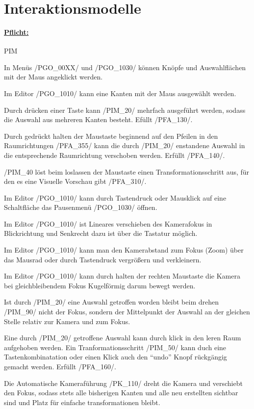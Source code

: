 %
%


%
%
\clearpage


\section{Interaktionsmodelle}
\label{NU:Interaktion}


\paragraph*{\underline{Pflicht:}}

\begin{ids}{\gls{PIM}}

	\id[10] In Menüs /PGO\_00XX/ und /PGO\_1030/ können Knöpfe und Auswahlflächen mit der Maus angeklickt werden.
	
	\id[20] Im Editor /PGO\_1010/ kann eine Kanten mit der Maus ausgewählt werden.
	
	\id[30] Durch drücken einer Taste kann /PIM\_20/ mehrfach ausgeführt werden, sodass die Auswahl aus mehreren Kanten besteht. Efüllt /PFA\_130/.
	
	\id[40] Durch gedrückt halten der Maustaste beginnend auf den Pfeilen in den Raumrichtungen /PFA\_355/ kann die durch /PIM\_20/ enstandene Auswahl in die entsprechende Raumrichtung verschoben werden. Erfüllt /PFA\_140/.
	
	\id[50] /PIM\_40 löst beim loslassen der Maustaste einen Transformationsschritt aus, für den es eine Visuelle Vorschau gibt /PFA\_310/.
	
	\id[60] Im Editor /PGO\_1010/ kann durch Tastendruck oder Mausklick auf eine Schaltfläche das Pausenmenü /PGO\_1030/ öffnen.
	
	\id[70] Im Editor /PGO\_1010/ ist Lineares verschieben des Kamerafokus in Blickrichtung und Senkrecht dazu ist über die Tastatur möglich.
	
	\id[80] Im Editor /PGO\_1010/ kann man den Kamerabstand zum Fokus (Zoom) über das Mausrad oder durch Tastendruck vergrößern und verkleinern.
	
	\id[90] Im Editor /PGO\_1010/ kann durch halten der rechten Maustaste die Kamera bei gleichbleibendem Fokus Kugelförmig darum bewegt werden.
	
	\id[100] Ist durch /PIM\_20/ eine Auswahl getroffen worden bleibt beim drehen /PIM\_90/ nicht der Fokus, sondern der Mittelpunkt der Auswahl an der gleichen Stelle relativ zur Kamera und zum Fokus.
	
	\id[110] Eine durch /PIM\_20/ getroffene Auswahl kann durch klick in den leren Raum aufgehoben werden.
	\id[120] Ein Tranformationsschritt /PIM\_50/ kann duch eine Tastenkombinatation oder einen Klick auch den "`undo"' Knopf rückgängig gemacht werden. Erfüllt /PFA\_160/.
	
	\id[130] Die Automatische Kameraführung /PK\_110/ dreht die Kamera und verschiebt den Fokus, sodass stets alle bisherigen Kanten und alle neu erstellten sichtbar sind und Platz für einfache transformationen bleibt.

\end{ids}


